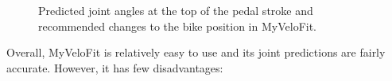 \begin{figure}[htb]
    \centering
    \hfill
    \caption{Predicted joint angles at the top of the pedal stroke and recommended changes to the bike position in MyVeloFit.}
    \label{fig:myvelofit}

\end{figure}




Overall, MyVeloFit is relatively easy to use and its joint predictions are fairly accurate. However, it has few disadvantages:


